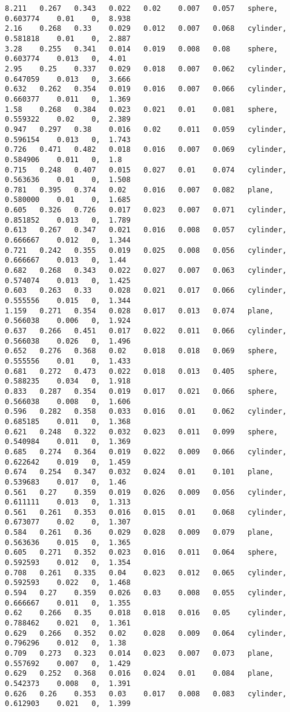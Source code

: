 {\begin{lstlisting}[caption={Datos obtenidos para la prueba del cilindro usando AE.}]
8.211	0.267	0.343	0.022	0.02	0.007	0.057	sphere, 	0.603774	0.01	0, 	8.938
2.16	0.268	0.33	0.029	0.012	0.007	0.068	cylinder, 	0.581818	0.01	0, 	2.887
3.28	0.255	0.341	0.014	0.019	0.008	0.08	sphere, 	0.603774	0.013	0, 	4.01
2.95	0.25	0.337	0.029	0.018	0.007	0.062	cylinder, 	0.647059	0.013	0, 	3.666
0.632	0.262	0.354	0.019	0.016	0.007	0.066	cylinder, 	0.660377	0.011	0, 	1.369
1.58	0.268	0.384	0.023	0.021	0.01	0.081	sphere, 	0.559322	0.02	0, 	2.389
0.947	0.297	0.38	0.016	0.02	0.011	0.059	cylinder, 	0.596154	0.013	0, 	1.743
0.726	0.471	0.482	0.018	0.016	0.007	0.069	cylinder, 	0.584906	0.011	0, 	1.8
0.715	0.248	0.407	0.015	0.027	0.01	0.074	cylinder, 	0.563636	0.01	0, 	1.508
0.781	0.395	0.374	0.02	0.016	0.007	0.082	plane,  	0.580000	0.01	0, 	1.685
0.605	0.326	0.726	0.017	0.023	0.007	0.071	cylinder, 	0.851852	0.013	0, 	1.789
0.613	0.267	0.347	0.021	0.016	0.008	0.057	cylinder, 	0.666667	0.012	0, 	1.344
0.721	0.242	0.355	0.019	0.025	0.008	0.056	cylinder, 	0.666667	0.013	0, 	1.44
0.682	0.268	0.343	0.022	0.027	0.007	0.063	cylinder, 	0.574074	0.013	0, 	1.425
0.603	0.263	0.33	0.028	0.021	0.017	0.066	cylinder, 	0.555556	0.015	0, 	1.344
1.159	0.271	0.354	0.028	0.017	0.013	0.074	plane,  	0.566038	0.006	0, 	1.924
0.637	0.266	0.451	0.017	0.022	0.011	0.066	cylinder, 	0.566038	0.026	0, 	1.496
0.652	0.276	0.368	0.02	0.018	0.018	0.069	sphere, 	0.555556	0.01	0, 	1.433
0.681	0.272	0.473	0.022	0.018	0.013	0.405	sphere, 	0.588235	0.034	0, 	1.918
0.833	0.287	0.354	0.019	0.017	0.021	0.066	sphere, 	0.566038	0.008	0, 	1.606
0.596	0.282	0.358	0.033	0.016	0.01	0.062	cylinder, 	0.685185	0.011	0, 	1.368
0.621	0.248	0.322	0.032	0.023	0.011	0.099	sphere, 	0.540984	0.011	0, 	1.369
0.685	0.274	0.364	0.019	0.022	0.009	0.066	cylinder, 	0.622642	0.019	0, 	1.459
0.674	0.254	0.347	0.032	0.024	0.01	0.101	plane,  	0.539683	0.017	0, 	1.46
0.561	0.27	0.359	0.019	0.026	0.009	0.056	cylinder, 	0.611111	0.013	0, 	1.313
0.561	0.261	0.353	0.016	0.015	0.01	0.068	cylinder, 	0.673077	0.02	0, 	1.307
0.584	0.261	0.36	0.029	0.028	0.009	0.079	plane,  	0.563636	0.015	0, 	1.365
0.605	0.271	0.352	0.023	0.016	0.011	0.064	sphere, 	0.592593	0.012	0, 	1.354
0.708	0.261	0.335	0.04	0.023	0.012	0.065	cylinder, 	0.592593	0.022	0, 	1.468
0.594	0.27	0.359	0.026	0.03	0.008	0.055	cylinder, 	0.666667	0.011	0, 	1.355
0.62	0.266	0.35	0.018	0.018	0.016	0.05	cylinder, 	0.788462	0.021	0, 	1.361
0.629	0.266	0.352	0.02	0.028	0.009	0.064	cylinder, 	0.796296	0.012	0, 	1.38
0.709	0.273	0.323	0.014	0.023	0.007	0.073	plane,  	0.557692	0.007	0, 	1.429
0.629	0.252	0.368	0.016	0.024	0.01	0.084	plane,  	0.542373	0.008	0, 	1.391
0.626	0.26	0.353	0.03	0.017	0.008	0.083	cylinder, 	0.612903	0.021	0, 	1.399

\end{lstlisting}}
